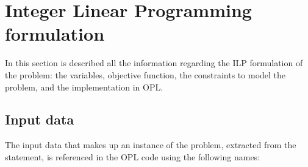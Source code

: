
\section{Integer Linear Programming formulation}
\label{sec:ILP-form}

In this section is described all the information regarding the ILP formulation of the problem: the
variables, objective function, the constraints to model the problem, and the implementation in OPL.

\subsection{Input data}
\label{sec:ILP-form:inp-data}

The input data that makes up an instance of the problem, extracted from the statement, is referenced in
the OPL code using the following names:

